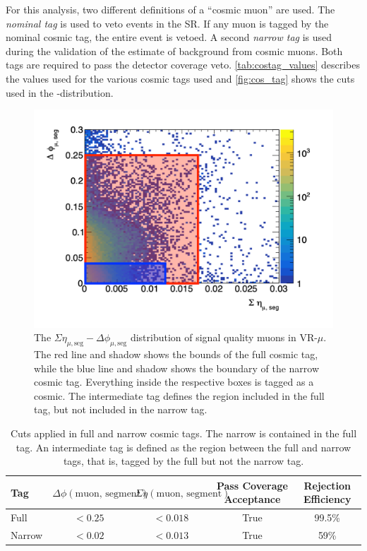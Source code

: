 For this analysis, two different definitions of a ``cosmic muon'' are used. The \emph{nominal tag} is used to veto events in the \ac{SR}. If any muon is tagged by the nominal cosmic tag, the entire event is vetoed. A second \emph{narrow tag} is used during the validation of the estimate of background from cosmic muons. Both tags are required to pass the detector coverage veto. \autoref{tab:costag_values} describes the values used for the various cosmic tags used and \autoref{fig:cos_tag} shows the cuts used in the \dphicos-\sigeta distribution. 

\begin{figure}[!ht]
\centering
\includegraphics[width=.48\textwidth]{figures/cosmics/cosmic_tag.png}
\caption{The $\Sigma\eta_{\mu,\textrm{seg}} - \Delta\phi_{\mu,\textrm{seg}}$ distribution of signal quality muons in VR-$\mu$. The red line and shadow shows the bounds of the full cosmic tag, while the blue line and shadow shows the boundary of the narrow cosmic tag. Everything inside the respective boxes is tagged as a cosmic. The intermediate tag defines the region included in the full tag, but not included in the narrow tag.}
\label{fig:cos_tag}
\end{figure}

\begin{table}
\centering
\begin{tabular}{lcccc}
Tag & $\Delta \phi (\textrm{muon, segment})$ & $\Sigma \eta (\textrm{muon, segment})$ & Pass Coverage Acceptance & Rejection Efficiency\\
\hline
Full   & $<0.25$   & $ <0.018 $   & True & 99.5\% \\
Narrow & $<0.02$   & $ <0.013$    & True & 59\% \\
\hline
\end{tabular}
\caption{Cuts applied in full and narrow cosmic tags. The narrow is contained in the full tag. An intermediate tag is defined as the region between the full and narrow tags, that is, tagged by the full but not the narrow tag.}
\label{tab:costag_values}
\end{table}

